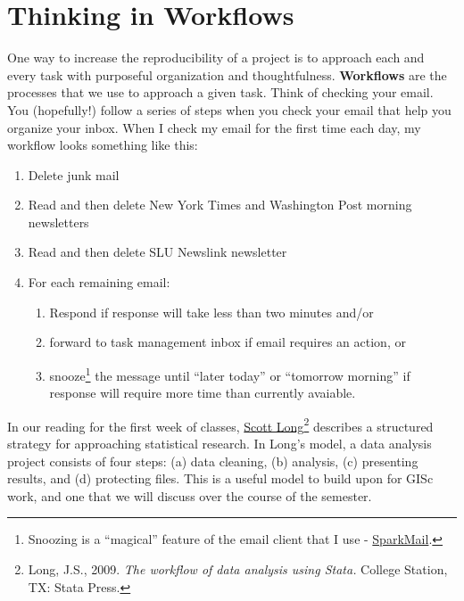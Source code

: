 \documentclass[]{book}
\providecommand{\tightlist}{%
  \setlength{\itemsep}{0pt}\setlength{\parskip}{0pt}}
\let\rmarkdownfootnote\footnote%
\def\footnote{\protect\rmarkdownfootnote}
\theoremstyle{definition}
\theoremstyle{definition}
\theoremstyle{remark}
\begin{document}
\section{Thinking in Workflows}\label{thinking-in-workflows}

One way to increase the reproducibility of a project is to approach each
and every task with purposeful organization and thoughtfulness.
\textbf{Workflows} are the processes that we use to approach a given
task. Think of checking your email. You (hopefully!) follow a series of
steps when you check your email that help you organize your inbox. When
I check my email for the first time each day, my workflow looks
something like this:

\begin{enumerate}
\def\labelenumi{\arabic{enumi}.}
\tightlist
\item
  Delete junk mail
\item
  Read and then delete New York Times and Washington Post morning
  newsletters
\item
  Read and then delete SLU Newslink newsletter
\item
  For each remaining email:

  \begin{enumerate}
  \def\labelenumii{\alph{enumii}.}
  \tightlist
  \item
    Respond if response will take less than two minutes and/or
  \item
    forward to task management inbox if email requires an action, or
  \item
    snooze\footnote{Snoozing is a ``magical'' feature of the email
      client that I use - \href{http://sparkmailapp.com}{SparkMail}.}
    the message until ``later today'' or ``tomorrow morning'' if
    response will require more time than currently avaiable.
  \end{enumerate}
\end{enumerate}

In our reading for the first week of classes,
\href{http://www.indiana.edu/~jslsoc/}{Scott Long}\footnote{Long, J.S.,
  2009. \emph{The workflow of data analysis using Stata.} College
  Station, TX: Stata Press.} describes a structured strategy for
approaching statistical research. In Long's model, a data analysis
project consists of four steps: (a) data cleaning, (b) analysis, (c)
presenting results, and (d) protecting files. This is a useful model to
build upon for GISc work, and one that we will discuss over the course
of the semester.
\end{document}
